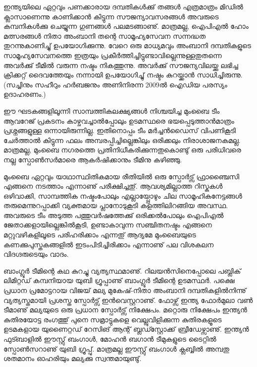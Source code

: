 ഇന്ത്യയിലെ ഏറ്റവും പണക്കാരായ ദമ്പതികള്‍ക്കു്  തങ്ങള്‍ എത്രമാത്രം മിഡില്‍ ക്ലാസാണെന്നു 
കാണിക്കാന്‍ കിട്ടുന്ന സൗജന്യാവസരങ്ങള്‍ അവരുടെ കമ്പനികള്‍ക്കു ചെയ്യുന്ന ഗുണങ്ങള്‍ പലമടങ്ങാണു്. മാത്രമല്ല, 
ഐപിഎല്‍ ഹോം മത്സരങ്ങള്‍ നിതാ അംബാനി തന്റെ സാമൂഹ്യസേവന സന്നദ്ധത തുറന്നുകാണിച്ചു് ഉപയോഗിക്കുന്നു. 
വേറെ ഒരു മാധ്യമവും അംബാനി ദമ്പതികളുടെ സാമൂഹ്യസേവനത്തെ ഇത്രയും പ്രകീര്‍ത്തിച്ചിട്ടുണ്ടാവില്ലെന്നുള്ളതുതന്നെ 
അവര്‍ക്കു് ടീമില്‍ വരുന്ന നഷ്ടം നികത്തുന്നു. അവര്‍ക്കു് സൗജന്യവിലയ്ക്കു ലഭിച്ച ക്രിക്കറ്റ് ദൈവത്തേയും നന്നായി ഉപയോഗിച്ചു് 
നഷ്ടം കുറയ്ക്കാന്‍ സാധിച്ചിരുന്നു. (സച്ചിനും സഹീറും ഹര്‍ബജനും അണിനിരന്ന 2009ല്‍ ഐഡിയ പരസ്യം ഉദാഹരണം.)

ഈ ഘടകങ്ങളിലൂന്നി സാമ്പത്തികലക്ഷ്യങ്ങള്‍ നിശ്ചയിച്ച മുംബൈ ടീം ആവറേജ് പ്രകടനം കാഴ്ചവച്ചാല്‍പ്പോലും ഉടമസ്ഥരെ 
ഭയപ്പെടുത്താന്‍മാത്രം പ്രശ്നങ്ങളുള്ള ഒന്നായിരുന്നില്ല. ഇതിനൊപ്പം ടീം മര്‍ച്ചന്‍ഡൈസ് വിപണികൂടി ചേര്‍ത്താല്‍ കിട്ടുന്ന 
ഫലം അമ്പരപ്പിച്ചില്ലെങ്കിലും ഒരിക്കലും നിരാശാജനകമല്ല. മാത്രമല്ല, മുംബൈ നഗരത്തെ പ്രതിനിധീകരിക്കുന്നതുകൊണ്ടു് ഒരു 
പരിധിവരെ നല്ല സ്പോണ്‍സര്‍മാരെ ആകര്‍ഷിക്കാനും ടീമിനു കഴിഞ്ഞു.

മുംബൈ ഏറ്റവും യാഥാസ്ഥിതികമായ രീതിയില്‍ ഒരു സ്പോര്‍ട്സ് ഫ്രാഞ്ചൈസി എങ്ങനെ നടത്താം എന്നാണു് പരീക്ഷിച്ചതു്. 
ആവശ്യമില്ലാത്ത റിസ്കുകള്‍ ഒഴിവാക്കി, സാമ്പത്തിക നഷ്ടംപോലും എല്ലായ്പ്പോഴും ചില സാമൂഹികനേട്ടങ്ങള്‍ തരുമെന്നുറപ്പാക്കി 
വ്യക്തമായ പ്ലാനോടുകൂടി കളത്തിലിറങ്ങിയ അവസ്ഥ. അവരുടെ ടീം അടുത്ത പത്തുവര്‍ഷത്തേക്കു് ഒരിക്കല്‍പോലും ഐപിഎല്‍ 
ജേതാക്കളായില്ലെങ്കില്‍കൂടി, ഉണ്ടാകാവുന്ന സഞ്ചിതനഷ്ടം എങ്ങനെ മറ്റുവഴികളിലൂടെ പരിഹരിക്കാം എന്നതു് ആദ്യമേ മുംബൈയുടെ 
കണക്കുപുസ്തകങ്ങളില്‍ ഇടംപിടിച്ചിരിക്കാം എന്നാണു് പല വിശകലന വിദഗ്ദരുടെയും വാദം.

ബാംഗ്ലൂര്‍ ടീമിന്റെ കഥ കുറച്ചു വ്യത്യസ്ഥമാണു്. റിലയന്‍സിനെപ്പോലെ പബ്ലിക് ലിമിറ്റഡ് കമ്പനിയായ യുബി ഗ്രൂപ്പാണു് 
ബാംഗ്ലൂര്‍ ടീമിന്റെ ഉടമസ്ഥര്‍. പക്ഷെ പ്രധാന പ്രമോട്ടറായ വിജയ് മല്യ മുകേഷ്-നിതാ അംബാനി ദമ്പതികളില്‍നിന്നു് 
വ്യത്യസ്തമായി പ്രശസ്ത സ്പോര്‍ട്സ് ഇന്‍വെസ്റ്ററാണു്. ഫോഴ്സ് ഇന്ത്യ ഫോര്‍മുലാ വണ്‍ ടീമാണു് മല്യയുടെ ഒരു പ്രധാന 
സ്പോര്‍ട്സ് നിക്ഷേപം. മറ്റൊരു നിക്ഷേപം ഇന്ത്യന്‍ കുതിരയോട്ട രംഗത്തു് പുനെ സമ്രാട്ടുകളെ വെല്ലുവിളിക്കുന്ന കുതിരകളൂടെ 
ഉടമകളായ യുണൈറ്റഡ് റേസിങ് ആന്റ് ബ്ലഡ്സ്റ്റോക്ക് ബ്രീഡേഴ്സാണു്. ഇന്ത്യന്‍ ഫുട്ബാളില്‍ ഈസ്റ്റു് ബംഗാള്‍, 
മോഹന്‍ ബഗാന്‍ ടീമുകളുടെ ടൈറ്റില്‍ സ്പോണ്‍സറാണു് യുബി ഗ്രൂപ്പു്. മാത്രമല്ല ഈസ്റ്റു് ബംഗാള്‍ ക്ലബ്ബില്‍ അമ്പതു 
ശതമാനം ഓഹരിയും മല്യക്കു സ്വന്തമായുണ്ടു്.


